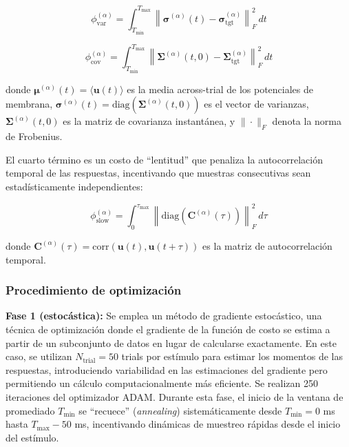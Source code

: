 \begin{equation}
\phi_{\text{var}}^{(\alpha)} = \int_{T_{\min}}^{T_{\max}} \left\| \boldsymbol{\sigma}^{(\alpha)}(t) - \boldsymbol{\sigma}_{\text{tgt}}^{(\alpha)} \right\|_F^2 \, dt
\label{eq:cost_var}
\end{equation}

\begin{equation}
\phi_{\text{cov}}^{(\alpha)} = \int_{T_{\min}}^{T_{\max}} \left\| \boldsymbol{\Sigma}^{(\alpha)}(t, 0) - \boldsymbol{\Sigma}_{\text{tgt}}^{(\alpha)} \right\|_F^2 \, dt
\label{eq:cost_cov}
\end{equation}

donde $\boldsymbol{\mu}^{(\alpha)}(t) = \langle \mathbf{u}(t) \rangle$ es la media across-trial de los potenciales de membrana, $\boldsymbol{\sigma}^{(\alpha)}(t) = \text{diag}(\boldsymbol{\Sigma}^{(\alpha)}(t, 0))$ es el vector de varianzas, $\boldsymbol{\Sigma}^{(\alpha)}(t, 0)$ es la matriz de covarianza instantánea, y $\|\cdot\|_F$ denota la norma de Frobenius.

El cuarto término es un costo de ``lentitud'' que penaliza la autocorrelación temporal de las respuestas, incentivando que muestras consecutivas sean estadísticamente independientes:

\begin{equation}
\phi_{\text{slow}}^{(\alpha)} = \int_0^{\tau_{\max}} \left\| \text{diag}(\mathbf{C}^{(\alpha)}(\tau)) \right\|_F^2 \, d\tau
\label{eq:cost_slow}
\end{equation}

donde $\mathbf{C}^{(\alpha)}(\tau) = \text{corr}(\mathbf{u}(t), \mathbf{u}(t + \tau))$ es la matriz de autocorrelación temporal.

\subsubsection{Procedimiento de optimización}

\textbf{Fase 1 (estocástica):} Se emplea un método de gradiente estocástico, una técnica de optimización donde el gradiente de la función de costo se estima a partir de un subconjunto de datos en lugar de calcularse exactamente. En este caso, se utilizan $N_{\text{trial}} = 50$ trials por estímulo para estimar los momentos de las respuestas, introduciendo variabilidad en las estimaciones del gradiente pero permitiendo un cálculo computacionalmente más eficiente. Se realizan 250 iteraciones del optimizador \acrshort{ADAM}. Durante esta fase, el inicio de la ventana de promediado $T_{\min}$ se ``recuece'' (\textit{annealing}) sistemáticamente desde $T_{\min} = 0$ ms hasta $T_{\max} - 50$ ms, incentivando dinámicas de muestreo rápidas desde el inicio del estímulo.


